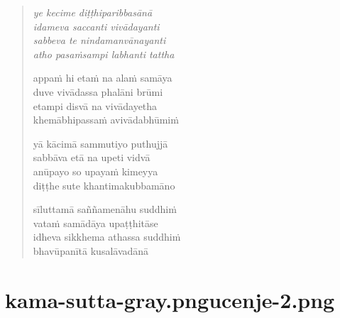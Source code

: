 

\cleartoverso

\vspace*{30mm}

\begin{verse}

\emph{ye kecime diṭṭhiparibbasānā\\
idameva saccanti vivādayanti}\\
\emph{sabbeva te nindamanvānayanti\\
atho pasaṁsampi labhanti tattha}

appaṁ hi etaṁ na alaṁ samāya\\
duve vivādassa phalāni brūmi\\
etampi disvā na vivādayetha\\
khemābhipassaṁ avivādabhūmiṁ

yā kācimā sammutiyo puthujjā\\
sabbāva etā na upeti vidvā\\
anūpayo so upayaṁ kimeyya\\
diṭṭhe sute khantimakubbamāno

sīluttamā saññamenāhu suddhiṁ\\
vataṁ samādāya upaṭṭhitāse\\
idheva sikkhema athassa suddhiṁ\\
bhavūpanītā kusalāvadānā

\end{verse}


\chapter[Mahābyūha Sutta]{{kama-sutta-gray.png}{ucenje-2.png}}

